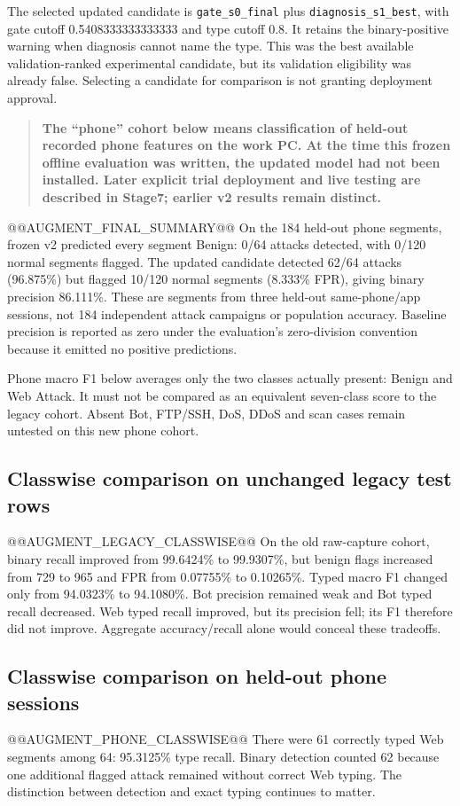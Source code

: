 \documentclass[11pt,a4paper,oneside]{report}
\newcommand{\code}[1]{\nolinkurl{#1}}
\newcommand{\important}[1]{\begin{quote}\color{blue!45!black}\textbf{#1}\end{quote}}
\begin{document}
The selected updated candidate is \code{gate_s0_final} plus \code{diagnosis_s1_best}, with gate cutoff 0.5408333333333333 and type cutoff 0.8. It retains the binary-positive warning when diagnosis cannot name the type. This was the best available validation-ranked experimental candidate, but its validation eligibility was already false. Selecting a candidate for comparison is not granting deployment approval.

\important{The ``phone'' cohort below means classification of held-out recorded phone features on the work PC. At the time this frozen offline evaluation was written, the updated model had not been installed. Later explicit trial deployment and live testing are described in Stage7; earlier v2 results remain distinct.}

@@AUGMENT_FINAL_SUMMARY@@
On the 184 held-out phone segments, frozen v2 predicted every segment Benign: 0/64 attacks detected, with 0/120 normal segments flagged. The updated candidate detected 62/64 attacks (96.875\%) but flagged 10/120 normal segments (8.333\% FPR), giving binary precision 86.111\%. These are segments from three held-out same-phone/app sessions, not 184 independent attack campaigns or population accuracy. Baseline precision is reported as zero under the evaluation's zero-division convention because it emitted no positive predictions.

Phone macro F1 below averages only the two classes actually present: Benign and Web Attack. It must not be compared as an equivalent seven-class score to the legacy cohort. Absent Bot, FTP/SSH, DoS, DDoS and scan cases remain untested on this new phone cohort.

\subsection{Classwise comparison on unchanged legacy test rows}
@@AUGMENT_LEGACY_CLASSWISE@@
On the old raw-capture cohort, binary recall improved from 99.6424\% to 99.9307\%, but benign flags increased from 729 to 965 and FPR from 0.07755\% to 0.10265\%. Typed macro F1 changed only from 94.0323\% to 94.1080\%. Bot precision remained weak and Bot typed recall decreased. Web typed recall improved, but its precision fell; its F1 therefore did not improve. Aggregate accuracy/recall alone would conceal these tradeoffs.

\subsection{Classwise comparison on held-out phone sessions}
@@AUGMENT_PHONE_CLASSWISE@@
There were 61 correctly typed Web segments among 64: 95.3125\% type recall. Binary detection counted 62 because one additional flagged attack remained without correct Web typing. The distinction between detection and exact typing continues to matter.
\end{document}
